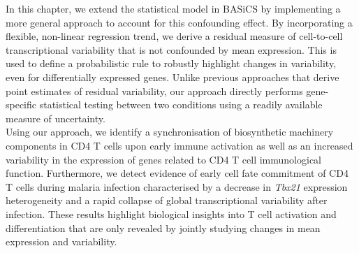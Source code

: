 In this chapter, we extend the statistical model in BASiCS by implementing a more general approach to account for this confounding effect. By incorporating a flexible, non-linear regression trend, we derive a residual measure of cell-to-cell transcriptional variability that is not confounded by mean expression. This is used to define a probabilistic rule to robustly highlight changes in variability, even for differentially expressed genes. Unlike previous approaches that derive point estimates of residual variability, our approach directly performs gene-specific statistical testing between two conditions using a readily available measure of uncertainty. \\

Using our approach, we identify a synchronisation of  biosynthetic machinery components in CD4\plus{} T cells upon early immune activation as well as an increased variability in the expression of genes related to CD4\plus{} T cell immunological function.
Furthermore, we detect evidence of early cell fate commitment of CD4\plus{} T cells during malaria infection characterised by a decrease in \textit{Tbx21} expression heterogeneity and a rapid collapse of global transcriptional variability after infection. These results highlight biological insights into T cell activation and differentiation that are only revealed by jointly studying changes in mean expression and variability.
